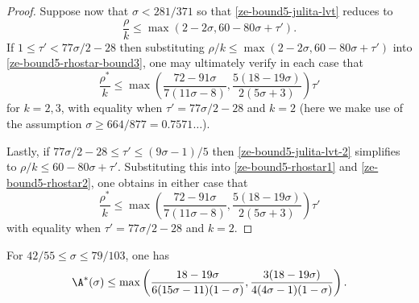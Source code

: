 \begin{proof}
Suppose now that $\sigma < 281/371$ so that \eqref{ze-bound5-julita-lvt} reduces to
\begin{equation}\label{ze-bound5-julita-lvt-2}
\frac{\rho}{k} \le \max(2 - 2\sigma, 60 - 80\sigma + \tau').
\end{equation}
If $1 \le \tau' < 77\sigma/2 - 28$ then substituting $\rho/k \le \max(2 - 2\sigma, 60 - 80\sigma + \tau')$ into \eqref{ze-bound5-rhostar-bound3}, one may ultimately verify in each case that
\[
\frac{\rho^*}{k} \le \max\left(\frac{72 - 91\sigma}{7(11\sigma - 8)}, \frac{5(18 - 19\sigma)}{2(5\sigma + 3)}\right)\tau'
\]
for $k = 2,3$, with equality when $\tau' = 77\sigma/2 - 28$ and $k = 2$ (here we make use of the assumption $\sigma \ge 664/877 = 0.7571\ldots$).

Lastly, if $77\sigma/2 - 28 \le \tau' \le (9\sigma - 1)/5$ then \eqref{ze-bound5-julita-lvt-2} simplifies to $\rho/k \le 60-80\sigma+\tau'$. Substituting this into \eqref{ze-bound5-rhostar1} and \eqref{ze-bound5-rhostar2}, one obtains in either case that
\[
\frac{\rho^*}{k} \le \max\left(\frac{72 - 91\sigma}{7(11\sigma - 8)}, \frac{5(18 - 19\sigma)}{2(5\sigma + 3)}\right)\tau'
\]
with equality when $\tau' = 77\sigma/2 - 28$ and $k = 2$.
\end{proof}

\begin{theorem}\label{imp-energy-bound6}
For $42/55 \le \sigma \le 79/103$, one has
\[
\A^*(\sigma) \le \max\left(\frac{18 - 19\sigma}{6(15\sigma - 11)(1- \sigma)}, \frac{3(18-19\sigma)}{4(4\sigma-1)(1 - \sigma)}\right).
\]
\end{theorem}
\derived
{}

